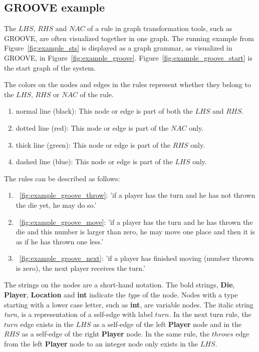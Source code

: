 \subsection{GROOVE example}
The $\mathit{LHS}$, $\mathit{RHS}$ and $\mathit{NAC}$ of a rule in graph transformation tools, such as GROOVE, are often visualized together in one graph. The running example from Figure~\ref{fig:example_sts} is displayed as a graph grammar, as visualized in GROOVE, in Figure~\ref{fig:example_groove}. Figure~\ref{fig:example_groove_start} is the start graph of the system.

The colors on the nodes and edges in the rules represent whether they belong to the $\mathit{LHS}$, $\mathit{RHS}$ or $\mathit{NAC}$ of the rule.
\begin{enumerate}
  \item normal line (black): This node or edge is part of both the $\mathit{LHS}$ and $\mathit{RHS}$.
  \item dotted line (red): This node or edge is part of the $\mathit{NAC}$ only.
  \item thick line (green): This node or edge is part of the $\mathit{RHS}$ only.
  \item dashed line (blue): This node or edge is part of the $\mathit{LHS}$ only.
\end{enumerate}

The rules can be described as follows:
\begin{enumerate}
  \item~\ref{fig:example_groove_throw}: 'if a player has the turn and he has not thrown the die yet, he may do so.'
  \item~\ref{fig:example_groove_move}: 'if a player has the turn and he has thrown the die and this number is larger than zero, he may move one place and then it is as if he has thrown one less.'
  \item~\ref{fig:example_groove_next}: 'if a player has finished moving (number thrown is zero), the next player receives the turn.'
\end{enumerate}

The strings on the nodes are a short-hand notation. The bold strings, \textbf{Die}, \textbf{Player}, \textbf{Location} and \textbf{int} indicate the \textit{type} of the node. Nodes with a type starting with a lower case letter, such as \textbf{int}, are variable nodes. The italic string \textit{turn}, is a representation of a self-edge with label $turn$. In the next turn rule, the $turn$ edge exists in the $\mathit{LHS}$ as a self-edge of the left \textbf{Player} node and in the $\mathit{RHS}$ as a self-edge of the right \textbf{Player} node. In the same rule, the $throws$ edge from the left \textbf{Player} node to an integer node only exists in the $\mathit{LHS}$.

